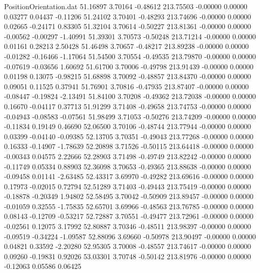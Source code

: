 \begin{filecontents}{PositionOrientation.dat}
  51.16897    3.70164   -0.48612   213.75503   -0.00000    0.00000    0.03277    0.04437   -0.11206
  51.24102    3.70401   -0.48293   213.74696   -0.00000    0.00000    0.02665   -0.24171    0.83305
  51.32104    3.70614   -0.50227   213.81361   -0.00000    0.00000   -0.00562   -0.00297   -1.40991
  51.39301    3.70573   -0.50248   213.71214   -0.00000    0.00000    0.01161    0.28213    2.50428
  51.46498    3.70657   -0.48217   213.89238   -0.00000    0.00000   -0.01282   -0.16466   -1.17064
  51.54500    3.70554   -0.49535   213.79870   -0.00000    0.00000   -0.07619   -0.03656    1.60692
  51.61700    3.70006   -0.49798   213.91439   -0.00000    0.00000    0.01198    0.13075   -0.98215
  51.68898    3.70092   -0.48857   213.84370   -0.00000    0.00000    0.09051    0.11525    0.37941
  51.76901    3.70816   -0.47935   213.87407   -0.00000    0.00000   -0.08447   -0.19824   -2.13491
  51.84100    3.70208   -0.49362   213.72038   -0.00000    0.00000    0.16670   -0.04117    0.37713
  51.91299    3.71408   -0.49658   213.74753   -0.00000    0.00000   -0.04943   -0.08583   -0.07561
  51.98499    3.71053   -0.50276   213.74209   -0.00000    0.00000   -0.11834    0.19149    0.46690
  52.06500    3.70106   -0.48744   213.77944   -0.00000    0.00000    0.03399   -0.04140   -0.09385
  52.13705    3.70351   -0.49043   213.77268   -0.00000    0.00000    0.16333   -0.14907   -1.78639
  52.20898    3.71526   -0.50115   213.64418   -0.00000    0.00000   -0.00343    0.04575    2.22666
  52.28903    3.71498   -0.49749   213.82242   -0.00000    0.00000   -0.11749    0.05334    0.88903
  52.36098    3.70653   -0.49365   213.88638   -0.00000    0.00000   -0.09458    0.01141   -2.63485
  52.43317    3.69970   -0.49282   213.69616   -0.00000    0.00000    0.17973   -0.02015    0.72794
  52.51289    3.71403   -0.49443   213.75419   -0.00000    0.00000   -0.18878   -0.20349    1.94802
  52.58495    3.70042   -0.50909   213.89457   -0.00000    0.00000   -0.01059    0.32555   -1.75835
  52.65701    3.69966   -0.48563   213.76785   -0.00000    0.00000    0.08143   -0.12709   -0.53217
  52.72887    3.70551   -0.49477   213.72961   -0.00000    0.00000   -0.02561    0.12075    3.17992
  52.80887    3.70346   -0.48511   213.98397   -0.00000    0.00000   -0.09519   -0.34224   -1.09587
  52.88096    3.69660   -0.50978   213.90497   -0.00000    0.00000    0.04821    0.33592   -2.20280
  52.95305    3.70008   -0.48557   213.74617   -0.00000    0.00000    0.09260   -0.19831    0.92026
  53.03301    3.70748   -0.50142   213.81976   -0.00000    0.00000   -0.12063    0.05586    0.06425

\end{filecontents}

